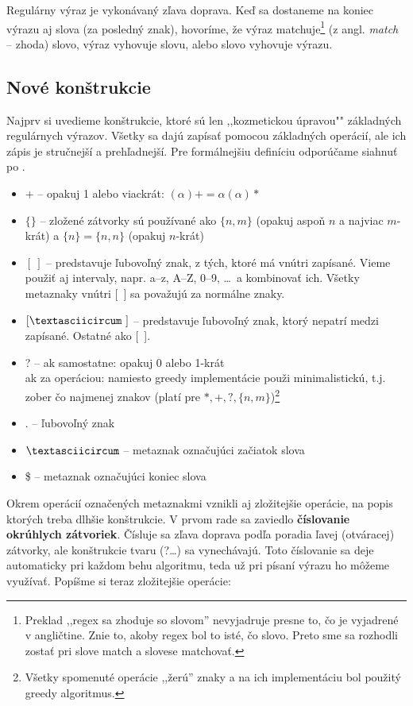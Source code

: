 Regulárny výraz je vykonávaný zľava doprava. Keď sa dostaneme na koniec výrazu aj slova (za posledný znak), hovoríme, že výraz matchuje\footnote{Preklad ,,regex sa zhoduje so slovom'' nevyjadruje presne to, čo je vyjadrené v angličtine. Znie to, akoby regex bol to isté, čo slovo. Preto sme sa rozhodli zostať pri slove match a slovese matchovať.} (z angl. \textit{match} -- zhoda) slovo, výraz vyhovuje slovu, alebo slovo vyhovuje výrazu.

\subsection{Nové konštrukcie}

Najprv si uvedieme konštrukcie, ktoré sú len ,,kozmetickou úpravou"" základných regulárnych výrazov. Všetky sa dajú zapísať pomocou základných operácií, ale ich zápis je stručnejší a prehľadnejší. Pre formálnejšiu definíciu odporúčame siahnuť po \cite{mojaBak}.
\begin{itemize}
\item $+$ -- opakuj 1 alebo viackrát: $(\alpha)+=\alpha(\alpha)*$
\item $\lbrace \rbrace$ -- zložené zátvorky sú používané ako $\{n,m\}$ (opakuj aspoň $n$ a najviac $m$-krát) a $\{n\}=\{n,n\}$ (opakuj $n$-krát)
\item $[~]$ -- predstavuje ľubovoľný znak, z tých, ktoré má vnútri zapísané. Vieme použiť aj intervaly, napr. a--z, A--Z, 0--9, \dots~a kombinovať ich. Všetky metaznaky vnútri [~] sa považujú za normálne znaky.
\item $[\textasciicircum~]$ -- predstavuje ľubovoľný znak, ktorý nepatrí medzi zapísané. Ostatné ako [~].
\item ? -- ak samostatne: opakuj 0 alebo 1-krát \\
ak za operáciou: namiesto greedy implementácie použi minimalistickú, t.j. zober čo najmenej znakov (platí pre $*,+,?,\lbrace n,m \rbrace$)\footnote{Všetky spomenuté operácie ,,žerú'' znaky a na ich implementáciu bol použitý greedy algoritmus.}
\end{itemize}


\begin{itemize}
\item . -- ľubovoľný znak
\item $\textasciicircum$ -- metaznak označujúci začiatok slova
\item \$ -- metaznak označujúci koniec slova
\end{itemize}

Okrem operácií označených metaznakmi vznikli aj zložitejšie operácie, na popis ktorých treba dlhšie konštrukcie. V prvom rade sa zaviedlo \textbf{číslovanie okrúhlych zátvoriek}. Čísluje sa zľava doprava podľa poradia ľavej (otváracej) zátvorky, ale konštrukcie tvaru (?\dots) sa vynechávajú. Toto číslovanie sa deje automaticky pri každom behu algoritmu, teda už pri písaní výrazu ho môžeme využívať. Popíšme si teraz zložitejšie operácie:

